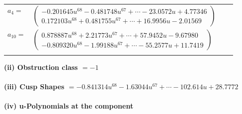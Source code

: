 \documentclass[1p]{elsarticle_modified}
\theoremstyle{definition}
\begin{document}
\begin{tabular}{m{7pt} m{180pt} m{7pt} m{180pt} }
\flushright $a_{4}=$&$\begin{pmatrix}-0.201645 u^{68}-0.481748 u^{67}+\cdots-23.0572 u+4.77346\\0.172103 u^{68}+0.481755 u^{67}+\cdots+16.9956 u-2.01569\end{pmatrix}$ \\
\flushright $a_{10}=$&$\begin{pmatrix}0.878887 u^{68}+2.21773 u^{67}+\cdots+57.9452 u-9.67980\\-0.809320 u^{68}-1.99188 u^{67}+\cdots-55.2577 u+11.7419\end{pmatrix}$\\&\end{tabular}
\flushleft \textbf{(ii) Obstruction class $= -1$}\\~\\
\flushleft \textbf{(iii) Cusp Shapes $= -0.841314 u^{68}-1.63044 u^{67}+\cdots-102.614 u+28.7772$}\\~\\
\newpage\renewcommand{\arraystretch}{1}
\flushleft \textbf{(iv) u-Polynomials at the component}\newline \\
\end{document}
